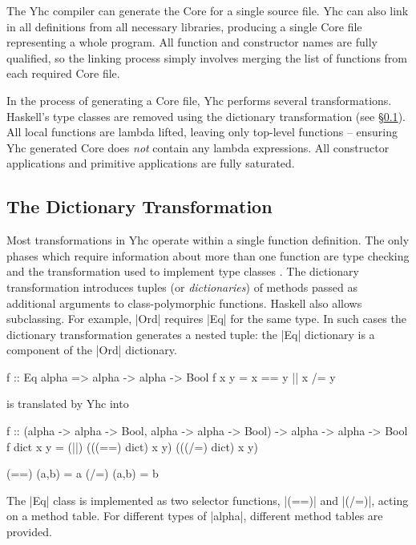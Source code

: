 The Yhc compiler can generate the Core for a single source file. Yhc can also link in all definitions from all necessary libraries, producing a single Core file representing a whole program. All function and constructor names are fully qualified, so the linking process simply involves merging the list of functions from each required Core file.

In the process of generating a Core file, Yhc performs several transformations. Haskell's type classes are removed using the dictionary transformation (see \S\ref{secB:dictionary_transformation}). All local functions are lambda lifted, leaving only top-level functions -- ensuring Yhc generated Core does \textit{not} contain any lambda expressions. All constructor applications and primitive applications are fully saturated.


\subsection{The Dictionary Transformation}
\label{secB:dictionary_transformation}

Most transformations in Yhc operate within a single function definition. The only phases which require information about more than one function are type checking and the transformation used to implement type classes \citep{wadler:type_classes}. The dictionary transformation introduces tuples (or \textit{dictionaries}) of methods passed as additional arguments to class-polymorphic functions. Haskell also allows subclassing. For example, |Ord| requires |Eq| for the same type. In such cases the dictionary transformation generates a nested tuple: the |Eq| dictionary is a component of the |Ord| dictionary.

\begin{example}
\label{exB:dictionary}
\begin{code}
f :: Eq alpha => alpha -> alpha -> Bool
f x y = x == y || x /= y
\end{code}

\noindent is translated by Yhc into

\ignore\begin{code}
f :: (alpha -> alpha -> Bool, alpha -> alpha -> Bool) -> alpha -> alpha -> Bool
f dict x y = (||) (((==) dict) x y) (((/=) dict) x y)

(==) (a,b) = a
(/=) (a,b) = b
\end{code}

The |Eq| class is implemented as two selector functions, |(==)| and |(/=)|, acting on a method table. For different types of |alpha|, different method tables are provided.
\end{example}

